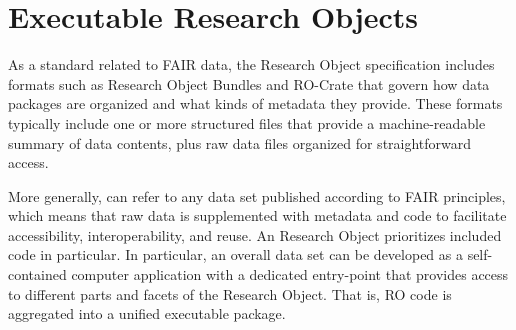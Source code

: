 
\section{Executable Research Objects}\fbeg{}\begin{frame}{}

\hspace*{-7pt}\begin{ftxt}[.95\textwidth]

As a standard related to FAIR data, the Research Object specification 
includes formats such as Research Object Bundles and RO-Crate that 
govern how data packages are organized and what 
kinds of metadata they provide.  These formats typically 
include one or more structured files that provide 
a machine-readable summary of data contents, plus 
raw data files organized for straightforward access.\\\vspace*{-13pt}

More generally,  can refer to any data 
set published according to FAIR principles, which means 
that raw data is supplemented with metadata and code 
to facilitate accessibility, interoperability, and reuse.  
An  Research Object prioritizes included code 
in particular.  In particular, an overall data set can be 
developed as a self-contained computer application with a 
dedicated entry-point that provides access to different 
parts and facets of the Research Object.  That is, RO 
code is aggregated into a unified executable package. 

\end{ftxt}

\end{frame}

